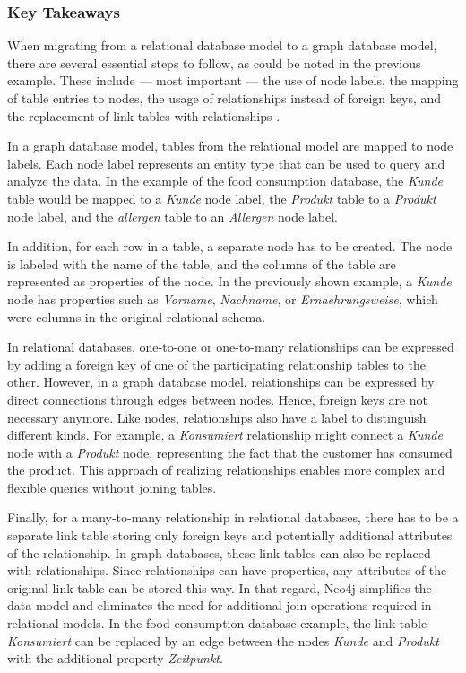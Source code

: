 \subsubsection*{Key Takeaways}

When migrating from a relational database model to a graph database model, there are several essential steps to follow, as could be noted in the previous example. These include --- most important --- the use of node labels, the mapping of table entries to nodes, the usage of relationships instead of foreign keys, and the replacement of link tables with relationships \parencite{neo4j_docs_migration}.

In a graph database model, tables from the relational model are mapped to node labels. Each node label represents an entity type that can be used to query and analyze the data. In the example of the food consumption database, the \textit{Kunde} table would be mapped to a \textit{Kunde} node label, the \textit{Produkt} table to a \textit{Produkt} node label, and the \textit{allergen} table to an \textit{Allergen} node label.

In addition, for each row in a table, a separate node has to be created. The node is labeled with the name of the table, and the columns of the table are represented as properties of the node. In the previously shown example, a \textit{Kunde} node has properties such as \textit{Vorname}, \textit{Nachname}, or \textit{Ernaehrungsweise}, which were columns in the original relational schema.

In relational databases, one-to-one or one-to-many relationships can be expressed by adding a foreign key of one of the participating relationship tables to the other. However, in a graph database model, relationships can be expressed by direct connections through edges between nodes. Hence, foreign keys are not necessary anymore. Like nodes, relationships also have a label to distinguish different kinds. For example, a \textit{Konsumiert} relationship might connect a \textit{Kunde} node with a \textit{Produkt} node, representing the fact that the customer has consumed the product. This approach of realizing relationships enables more complex and flexible queries without joining tables.

Finally, for a many-to-many relationship in relational databases, there has to be a separate link table storing only foreign keys and potentially additional attributes of the relationship. In graph databases, these link tables can also be replaced with relationships. Since relationships can have properties, any attributes of the original link table can be stored this way. In that regard, Neo4j simplifies the data model and eliminates the need for additional join operations required in relational models. In the food consumption database example, the link table \textit{Konsumiert} can be replaced by an edge between the nodes \textit{Kunde} and \textit{Produkt} with the additional property \textit{Zeitpunkt}.

